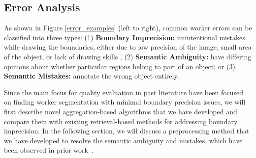 \subsection{Error Analysis}
\par As shown in Figure \ref{error_examples} (left to right), common worker errors can be classified into three types: (1) \textbf{Boundary Imprecision:} unintentional mistakes while drawing the boundaries, either due to low precision of the image, small area of the object, or lack of drawing skills , (2) \textbf{Semantic Ambiguity:} have differing opinions about whether particular regions belong to part of an object; or (3) \textbf{Semantic Mistakes:} annotate the wrong object entirely.
\par %
Since the main focus for quality evaluation in past literature have been focused on finding worker segmentation with minimal boundary precision issues, we will first describe novel aggregation-based algorithms that we have developed and compare them with existing retrieval-based methods for addressing boundary imprecision. In the following section, we will discuss a preprocessing method that we have developed to resolve the semantic ambiguity and mistakes, which have been observed in prior work~\cite{Sorokin2008,Lin2014,Gurari2018}.